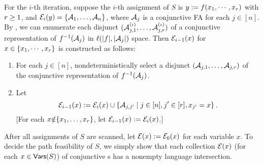 
%

For the $i$-th iteration, suppose the $i$-th assignment of $S$ is $y:= f(x_1,
\cdots, x_r)$ with $r\geq 1$,  and 
$\mathcal{E}_i(y)=\{\mathcal{A}_1, \ldots, \mathcal{A}_n\}$, 
where $\mathcal{A}_j$ is a conjunctive FA for each $j \in [n]$.
By \prerec{}, we can enumerate each disjunct $(\mathcal{A}^{(\iota)}_{j, 1}, \ldots, \mathcal{A}^{(\iota)}_{j, r})$ of a conjunctive representation of 
$f^{-1}(\mathcal{A}_j)$ in $\ell(|f|,|\mathcal{A}_j|)$ space.
Then $\mathcal{E}_{i-1}(x)$ for $x \in  \{x_1,\cdots, x_r\}$ is constructed as follows: %
\begin{enumerate}
\item For each $j \in [n]$, nondeterministically select a disjunct $\left(\mathcal{A}_{j, 1}, \ldots, \mathcal{A}_{j, r}\right)$ of the conjunctive representation of $f^{-1}(\mathcal{A}_j)$.
%
\item 
Let
\[
    \mathcal{E}_{i-1}(x):= \mathcal{E}_{i}(x) \cup \left\{\mathcal{A}_{j, j'} \mid  j \in [n], j' \in [r], x_{j'} = x
        \right\}.
\]
[For each $x{\notin} \{x_1,\ldots, x_r\}$, let $\mathcal{E}_{i-1}(x) := 
        \mathcal{E}_i(x)$.]
%
\end{enumerate}
%
After all assignments of $S$ are scanned,  let $\mathcal{E}(x):=\mathcal{E}_{0}(x)$ for each variable $x$.
To decide the path feasibility of $S$, we simply show that each collection
$\mathcal{E}(x)$ (for each $x \in \mathsf{Vars}(S)$) of conjunctive \FA{}s has a nonempty 
language intersection.


